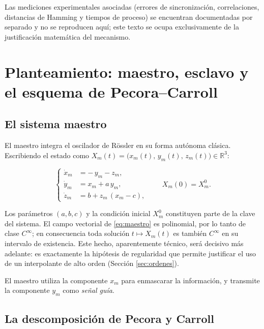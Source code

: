 \documentclass[12pt,a4paper]{article}
\newcommand{\R}{\mathbb{R}}
\begin{document}
Las mediciones experimentales asociadas (errores de sincronización, correlaciones,
distancias de Hamming y tiempos de proceso) se encuentran documentadas por separado
y no se reproducen aquí; este texto se ocupa exclusivamente de la justificación
matemática del mecanismo.

\section{Planteamiento: maestro, esclavo y el esquema de Pecora--Carroll}
\label{sec:planteamiento}

\subsection{El sistema maestro}

El maestro integra el oscilador de Rössler en su forma autónoma clásica. Escribiendo
el estado como $X_m(t) = \bigl(x_m(t),\,y_m(t),\,z_m(t)\bigr) \in \R^3$:

\begin{equation}
\label{eq:maestro}
\left\{
\begin{aligned}
  \dot{x}_m &= -\,y_m - z_m,\\
  \dot{y}_m &= x_m + a\,y_m,\\
  \dot{z}_m &= b + z_m\,(x_m - c),
\end{aligned}
\right.
\qquad X_m(0) = X_m^{0}.
\end{equation}

Los parámetros $(a,b,c)$ y la condición inicial $X_m^0$ constituyen parte de la
clave del sistema. El campo vectorial de \eqref{eq:maestro} es polinomial, por lo
tanto de clase $C^{\infty}$; en consecuencia toda solución $t \mapsto X_m(t)$ es
también $C^{\infty}$ en su intervalo de existencia. Este hecho, aparentemente
técnico, será decisivo más adelante: es exactamente la hipótesis de regularidad que
permite justificar el uso de un interpolante de alto orden
(Sección \ref{sec:ordenes}).

El maestro utiliza la componente $x_m$ para enmascarar la información, y transmite
la componente $y_m$ como \emph{señal guía}.

\subsection{La descomposición de Pecora y Carroll}
\end{document}
